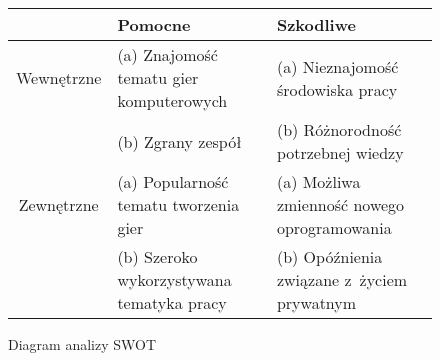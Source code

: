 \begin{figure}[H]
    \centering
        \caption{Diagram analizy SWOT}
        \begin{tabular}{ |c|p{4.5cm}|p{4.5cm}|  }
            \hline
            & Pomocne & Szkodliwe\\
            \hline
            Wewnętrzne & (a) Znajomość tematu gier komputerowych & (a) Nieznajomość środowiska pracy \\
            & (b) Zgrany zespół & (b) Różnorodność potrzebnej wiedzy \\
            \hline
            Zewnętrzne & (a) Popularność tematu tworzenia gier & (a) Możliwa zmienność nowego oprogramowania\\
            & (b) Szeroko wykorzystywana tematyka pracy & (b) Opóźnienia związane z~życiem prywatnym\\
            \hline
        \end{tabular}
\end{figure}


